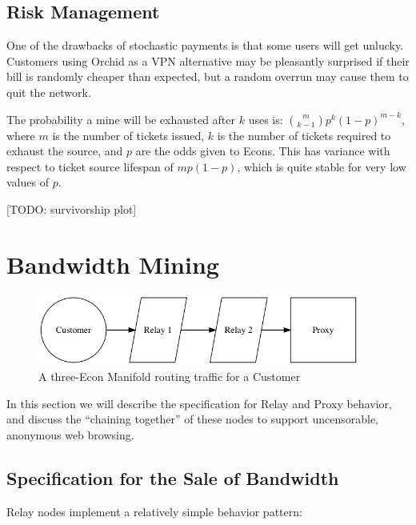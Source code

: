 \documentclass{article}
\newcommand{\orchid}{Orchid}
\newcommand{\Orchid}{\orchid}
\begin{document}
\subsection{Risk Management}

One of the drawbacks of stochastic payments is that some users will
get unlucky. Customers using \Orchid{} as a VPN alternative may be
pleasantly surprised if their bill is randomly cheaper than expected,
but a random overrun may cause them to quit the network.

The probability a mine will be exhausted after $k$ uses is:
$\binom{m}{k-1} p^{k} (1-p)^{m-k}$, where $m$ is the number of tickets
issued, $k$ is the number of tickets required to exhaust the source,
and $p$ are the odds given to Econs. This has variance with respect to
ticket source lifespan of $m p (1-p)$, which is quite stable for very
low values of $p$.

[TODO: survivorship plot]

\section{Bandwidth Mining}
\label{sec:mining}

\begin{figure}[htbp]
  \centering
  \includegraphics[width = 300pt]{sttc}
  \caption{A three-Econ Manifold routing traffic for a Customer}
\end{figure}

In this section we will describe the specification for Relay and Proxy
behavior, and discuss the ``chaining together'' of these nodes to
support uncensorable, anonymous web browsing.

\subsection{Specification for the Sale of Bandwidth}

Relay nodes implement a relatively simple behavior pattern:
\end{document}
